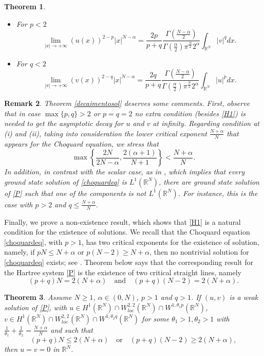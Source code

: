 \documentclass[12pt,a4paper]{article}
\newtheorem{theorem}{Theorem}[section]
\newtheorem{remark}[theorem]{Remark}
\numberwithin{equation}{section}
\begin{document}
\begin{theorem}
\begin{itemize}
\item[(e)] For $p<2$
$$
\lim\limits_{|x|\rightarrow +\infty} (u(x))^{2-p}|x|^{N-\alpha}= \dfrac{2p}{p+q}\dfrac{\Gamma\left(\frac{N-\alpha}{2}\right)}{\Gamma\left(\frac{\alpha}{2}\right)\pi^{\frac{N}{2}}2^\alpha}\int_{\mathbb{R}^N} |v|^q dx.$$

\item[(f)] For $q<2$ 
$$\lim\limits_{|x|\rightarrow +\infty} (v(x))^{2-q}|x|^{N-\alpha}= \dfrac{2q}{p+q}\dfrac{\Gamma\left(\frac{N-\alpha}{2}\right)}{\Gamma\left(\frac{\alpha}{2}\right)\pi^{\frac{N}{2}}2^\alpha}\int_{\mathbb{R}^N} |u|^p dx.
$$
\end{itemize}
\end{theorem}


\begin{remark}
Theorem \ref{decaimentosol} deserves some comments. First, observe that in case $\max\{p,q\} >2$ or $p=q=2$ no extra condition (besides \eqref{H1}) is needed to get the asymptotic decay for $u$ and $v$ at infinity. Regarding condition at (i) and (ii), taking into consideration the lower critical exponent $\frac{N+\alpha}{N}$ that appears for the Choquard equation, we stress that
\[
\max\left\{ \frac{2N}{2N-\alpha}, \frac{2(\alpha+1)}{N+1}\right\} < \frac{N+\alpha}{N}.
\]
In addition, in contrast with the scalar case, as in \cite[Theorem 4]{Moroz2013}, which implies that every ground state solution of \eqref{choquardeq} is $L^1(\mathbb{R}^N)$, there are ground state solution of \eqref{P} such that one of the components is not $L^1(\mathbb{R}^N)$. For instance, this is the case with $p>2$ and $q \leq \frac{N+\alpha}{N}$.
\end{remark}

\medbreak
Finally, we prove a non-existence result, which shows that \eqref{H1} is a natural condition for the existence of solutions. We recall that the Choquard equation \eqref{choquardeq}, with $p>1$, has two critical exponents for the existence of solution, namely, if $pN \leq N+\alpha$ or $p(N-2)\geq N+\alpha$, then no nontrivial solution for \eqref{choquardeq} exists; see \cite[Theorem 2]{Moroz2013}. Theorem below says that the corresponding result for the Hartree system \eqref{P} is the existence of two critical straight lines, namely
\[
(p+q)N = 2(N+\alpha) \quad \text{and} \quad (p+q)(N-2) = 2(N+\alpha).
\]


\begin{theorem}\label{t4}
Assume $N\geq 1$, $\alpha\in (0, N)$, $p>1$ and $q>1$. If $(u,v)$ is a weak solution of \eqref{P}, with $u\in H^{1}(\mathbb{R}^N) \cap W_{loc}^{2, 2}(\mathbb{R}^N)\cap W^{1, \theta_1 p}(\mathbb{R}^N)$, $v\in H^{1}(\mathbb{R}^N) \cap W_{loc}^{2, 2}(\mathbb{R}^N)\cap W^{1, \theta_2 q}(\mathbb{R}^N)$ for some $\theta_1>1, \theta_2> 1$ with $\frac{1}{\theta_1}+ \frac{1}{\theta_ 2} = \frac{N+\alpha}{N}$ and such that
\[
(p+q)N \leq 2(N+\alpha) \quad \text{or} \quad (p+q)(N-2) \geq 2(N+\alpha) ,
\]
then $u= v=0$ in $\mathbb{R}^N$.
\end{theorem}
\end{document}
